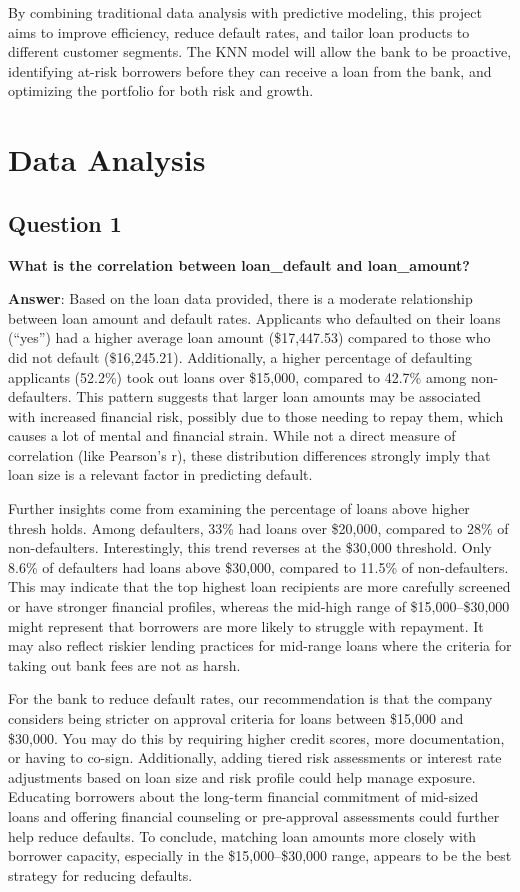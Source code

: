 \documentclass[
]{article}
\begin{document}
By combining traditional data analysis with predictive modeling, this
project aims to improve efficiency, reduce default rates, and tailor
loan products to different customer segments. The KNN model will allow
the bank to be proactive, identifying at-risk borrowers before they can
receive a loan from the bank, and optimizing the portfolio for both risk
and growth.

\section{Data Analysis}\label{data-analysis}

\subsection{Question 1}\label{question-1}

\textbf{What is the correlation between loan\_default and loan\_amount?}

\textbf{Answer}: Based on the loan data provided, there is a moderate
relationship between loan amount and default rates. Applicants who
defaulted on their loans (``yes'') had a higher average loan amount
(\$17,447.53) compared to those who did not default (\$16,245.21).
Additionally, a higher percentage of defaulting applicants (52.2\%) took
out loans over \$15,000, compared to 42.7\% among non-defaulters. This
pattern suggests that larger loan amounts may be associated with
increased financial risk, possibly due to those needing to repay them,
which causes a lot of mental and financial strain. While not a direct
measure of correlation (like Pearson's r), these distribution
differences strongly imply that loan size is a relevant factor in
predicting default.

Further insights come from examining the percentage of loans above
higher thresh holds. Among defaulters, 33\% had loans over \$20,000,
compared to 28\% of non-defaulters. Interestingly, this trend reverses
at the \$30,000 threshold. Only 8.6\% of defaulters had loans above
\$30,000, compared to 11.5\% of non-defaulters. This may indicate that
the top highest loan recipients are more carefully screened or have
stronger financial profiles, whereas the mid-high range of
\$15,000--\$30,000 might represent that borrowers are more likely to
struggle with repayment. It may also reflect riskier lending practices
for mid-range loans where the criteria for taking out bank fees are not
as harsh.

For the bank to reduce default rates, our recommendation is that the
company considers being stricter on approval criteria for loans between
\$15,000 and \$30,000. You may do this by requiring higher credit
scores, more documentation, or having to co-sign. Additionally, adding
tiered risk assessments or interest rate adjustments based on loan size
and risk profile could help manage exposure. Educating borrowers about
the long-term financial commitment of mid-sized loans and offering
financial counseling or pre-approval assessments could further help
reduce defaults. To conclude, matching loan amounts more closely with
borrower capacity, especially in the \$15,000--\$30,000 range, appears
to be the best strategy for reducing defaults.
\end{document}
